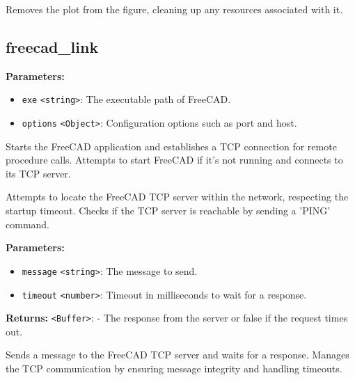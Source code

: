 \documentclass[12pt,a4paper]{article}
\begin{document}
\noindent Removes the plot from the figure, cleaning up any resources associated with it.


\subsection{freecad\_link}
\vspace{5mm}
\noindent {}


\noindent \textbf{Parameters:}
\begin{itemize}
  \item \texttt{exe} \texttt{<string>}: The executable path of FreeCAD.
  \item \texttt{options} \texttt{<Object>}: Configuration options such as port and host.
\end{itemize}

\noindent Starts the FreeCAD application and establishes a TCP connection for remote procedure calls.
Attempts to start FreeCAD if it's not running and connects to its TCP server.

\vspace{5mm}
\noindent {}


\noindent Attempts to locate the FreeCAD TCP server within the network, respecting the startup timeout.
Checks if the TCP server is reachable by sending a 'PING' command.

\vspace{5mm}
\noindent {}


\noindent \textbf{Parameters:}
\begin{itemize}
  \item \texttt{message} \texttt{<string>}: The message to send.
  \item \texttt{timeout} \texttt{<number>}: Timeout in milliseconds to wait for a response.
\end{itemize}

\noindent \textbf{Returns:} \texttt{<Buffer>}: - The response from the server or false if the request times out.

\noindent Sends a message to the FreeCAD TCP server and waits for a response.
Manages the TCP communication by ensuring message integrity and handling timeouts.
\end{document}
